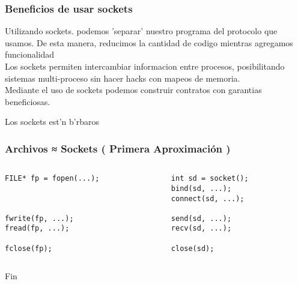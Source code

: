 \documentclass{beamer}
\begin{document}

\begin{frame}
    \frametitle{Beneficios de usar sockets}
    Utilizando sockets. podemos 'separar' nuestro programa del protocolo que usamos. De esta manera, reducimos la cantidad de codigo mientras agregamos funcionalidad\\
    Los sockets permiten intercambiar informacion entre procesos, posibilitando sistemas multi-proceso sin hacer hacks con mapeos de memoria.\\
    Mediante el uso de sockets podemos construir contratos con garantias beneficiosas.
\end{frame}


\begin{frame}
    \Huge{\centerline{Los sockets est\a'n b\a'rbaros}}
\end{frame}


\begin{frame}[fragile]
    \frametitle{Archivos ≈ Sockets ( Primera Aproximaci\'on )}
    \begin{columns}
        \begin{column}{0.5\textwidth}
            \begin{verbatim}
FILE* fp = fopen(...);



fwrite(fp, ...);
fread(fp, ...);

fclose(fp);    
            \end{verbatim}        
        \end{column}
        \begin{column}{0.5\textwidth}
            \begin{verbatim}
int sd = socket();
bind(sd, ...);
connect(sd, ...);

send(sd, ...);
recv(sd, ...);

close(sd);
            \end{verbatim}
        \end{column}
    \end{columns}
\end{frame}


\begin{frame}
\Huge{\centerline{Fin}}
\end{frame}

\end{document}
